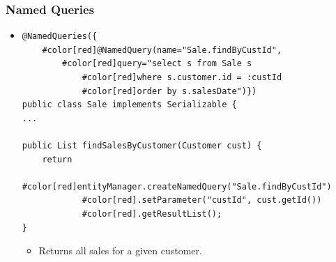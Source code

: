 \documentclass[10pt,xcolor=pdflatex]{beamer}
\begin{document}
\begin{frame}[fragile]\frametitle{Named Queries}
	\begin{itemize}
		\item[]
        	\begin{Verbatim}[fontsize=\footnotesize, commandchars=\#\[\]]
@NamedQueries({
    #color[red]@NamedQuery(name="Sale.findByCustId",
        #color[red]query="select s from Sale s
            #color[red]where s.customer.id = :custId
            #color[red]order by s.salesDate")})
public class Sale implements Serializable {
...

public List findSalesByCustomer(Customer cust) {
    return
        #color[red]entityManager.createNamedQuery("Sale.findByCustId")
            #color[red].setParameter("custId", cust.getId())
            #color[red].getResultList();
}
			\end{Verbatim}
          \begin{itemize}
            \item  Returns all sales for a given customer.
          \end{itemize}
	\end{itemize}
\end{frame}
\end{document}
